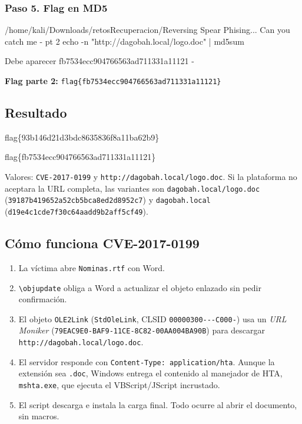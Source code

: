 \documentclass[11pt,a4paper]{article}
\newcommand{\flagbox}[2]{\begin{tcolorbox}[enhanced, colback=flagbg, colframe=green!45!black, boxrule=0.8pt, arc=3pt,
  fonttitle=\bfseries, title={#1}, halign=center]{\Large\ttfamily #2}\end{tcolorbox}}
\newcommand{\bs}{\textbackslash\allowbreak{}}
\begin{document}
\subsubsection*{Paso 5. Flag en MD5}
\begin{comando}{/home/kali/Downloads/retosRecuperacion/Reversing Spear Phising... Can you catch me - pt 2}
echo -n "http://dagobah.local/logo.doc" | md5sum
\end{comando}
\begin{salida}{Debe aparecer}
fb7534ecc904766563ad711331a11121  -
\end{salida}
\begin{nota}\textbf{Flag parte 2:} \texttt{flag\{fb7534ecc904766563ad711331a11121\}}\end{nota}


\subsection{Resultado}
\flagbox{Parte 1: CVE (validada)}{flag\{93b146d21d3bdc8635836f8a11ba62b9\}}
\flagbox{Parte 2: URL dañina}{flag\{fb7534ecc904766563ad711331a11121\}}
Valores: \texttt{CVE-2017-0199} y \texttt{http://dagobah.local/logo.doc}. Si la plataforma no aceptara la URL
completa, las variantes son \texttt{dagobah.local/logo.doc} (\texttt{39187b419652a52cb5bca8ed2d8952c7}) y
\texttt{dagobah.local} (\texttt{d19e4c1cde7f30c64aadd9b2aff5cf49}).

\subsection{Cómo funciona CVE-2017-0199}
\begin{enumerate}
  \item La víctima abre \texttt{Nominas.rtf} con Word.
  \item \texttt{\bs objupdate} obliga a Word a actualizar el objeto enlazado sin pedir confirmación.
  \item El objeto \texttt{OLE2Link} (\texttt{StdOleLink}, CLSID \texttt{00000300---\allowbreak C000-}) usa un
        \emph{URL Moniker} (\texttt{79EAC9E0-\allowbreak BAF9-\allowbreak 11CE-\allowbreak 8C82-\allowbreak 00AA004BA90B}) para descargar
        \texttt{http://dagobah.local/logo.doc}.
  \item El servidor responde con \texttt{Content-Type: application/hta}. Aunque la extensión sea \texttt{.doc}, Windows
        entrega el contenido al manejador de HTA, \texttt{mshta.exe}, que ejecuta el VBScript/JScript incrustado.
  \item El script descarga e instala la carga final. Todo ocurre al abrir el documento, sin macros.
\end{enumerate}
\end{document}
